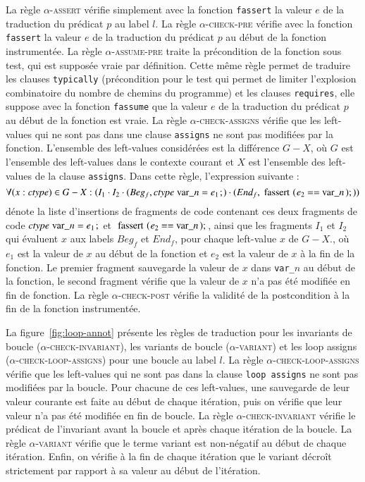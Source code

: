 La règle \textsc{$\alpha$-assert} vérifie simplement avec la fonction
\lstinline'fassert' la valeur $e$ de la traduction du prédicat $p$ au label $l$.
La règle \textsc{$\alpha$-check-pre} vérifie avec la fonction
\lstinline'fassert' la valeur $e$ de la traduction du prédicat $p$ au début de
la fonction instrumentée.
La règle \textsc{$\alpha$-assume-pre} traite la précondition de la fonction sous
test, qui est supposée vraie par définition.
Cette même règle permet de traduire les clauses \lstinline'typically'
(précondition pour le test qui permet de limiter l'explosion combinatoire du
nombre de chemins du programme) et les clauses \lstinline'requires', elle
suppose avec la fonction \lstinline'fassume' que la valeur $e$ de la
traduction du prédicat $p$ au début de la fonction est vraie.
La règle \textsc{$\alpha$-check-assigns} vérifie que les left-values qui ne sont
pas dans une clause \lstinline'assigns' ne sont pas modifiées par la fonction.
L'ensemble des left-values considérées est la différence $G-X$, où $G$ est
l'ensemble des left-values dans le contexte courant et $X$ est l'ensemble des
left-values de la clause \lstinline'assigns'.
Dans cette règle, l'expression suivante :
\[
\forall (x:\mathit{ctype}) \in G-X :
(I_1 \concat I_2 \concat
(Beg_f, \mathit{ctype}~\mbox{\lstinline'var_'}n = e_1\semicolon)
\concat (End_f, \mbox{\lstinline'fassert('}e_2~\mbox{\lstinline'== var_'}n\mbox{\lstinline');'}) )
\]
dénote la liste d'insertions de fragments de code contenant ces deux fragments
de code $\mathit{ctype}~\mbox{\lstinline'var_'}n = e_1\semicolon$ et
$\mbox{\lstinline'fassert('}e_2~\mbox{\lstinline'== var_'}n\mbox{\lstinline');'}$, ainsi que les fragments $I_1$ et $I_2$ qui évaluent $x$ aux labels $Beg_f$ et
$End_f$, pour chaque left-value $x$ de $G-X$., où $e_1$ est la valeur de $x$ au
début de la fonction et $e_2$ est la valeur de $x$ à la fin de la fonction.
Le premier fragment sauvegarde la valeur de $x$ dans \lstinline'var_'$n$ au
début de la fonction, le second fragment vérifie que la valeur de $x$ n'a pas
été modifiée en fin de fonction.
La règle \textsc{$\alpha$-check-post} vérifie la validité de la postcondition
à la fin de la fonction instrumentée.



La figure~\ref{fig:loop-annot} présente les règles de traduction pour les
invariants de boucle (\textsc{$\alpha$-check-invariant}), les variants de boucle
(\textsc{$\alpha$-variant}) et les loop assigns
(\textsc{$\alpha$-check-loop-assigns}) pour une boucle au label $l$.
La règle \textsc{$\alpha$-check-loop-assigns} vérifie que les left-values qui ne
sont pas dans la clause \lstinline'loop assigns' ne sont pas modifiées par la
boucle.
Pour chacune de ces left-values, une sauvegarde de leur valeur courante est
faite au début de chaque itération, puis on vérifie que leur valeur n'a pas été
modifiée en fin de boucle.
La règle \textsc{$\alpha$-check-invariant} vérifie le prédicat de l'invariant
avant la boucle et après chaque itération de la boucle.
La règle \textsc{$\alpha$-variant} vérifie que le terme variant est non-négatif
au début de chaque itération.
Enfin, on vérifie à la fin de chaque itération que le variant décroît
strictement par rapport à sa valeur au début de l'itération.



